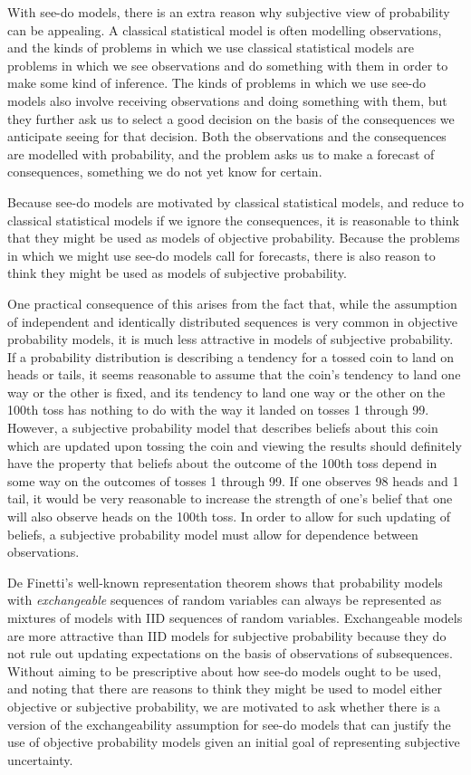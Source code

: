 With see-do models, there is an extra reason why subjective view of probability can be appealing. A classical statistical model is often modelling observations, and the kinds of problems in which we use classical statistical models are problems in which we see observations and do something with them in order to make some kind of inference. The kinds of problems in which we use see-do models also involve receiving observations and doing something with them, but they further ask us to select a good decision on the basis of the consequences we anticipate seeing for that decision. Both the observations and the consequences are modelled with probability, and the problem asks us to make a forecast of consequences, something we do not yet know for certain.

Because see-do models are motivated by classical statistical models, and reduce to classical statistical models if we ignore the consequences, it is reasonable to think that they might be used as models of objective probability. Because the problems in which we might use see-do models call for forecasts, there is also reason to think they might be used as models of subjective probability.

One practical consequence of this arises from the fact that, while the assumption of independent and identically distributed sequences is very common in objective probability models, it is much less attractive in models of subjective probability. If a probability distribution is describing a tendency for a tossed coin to land on heads or tails, it seems reasonable to assume that the coin's tendency to land one way or the other is fixed, and its tendency to land one way or the other on the 100th toss has nothing to do with the way it landed on tosses 1 through 99. However, a subjective probability model that describes beliefs about this coin which are updated upon tossing the coin and viewing the results should definitely have the property that beliefs about the outcome of the 100th toss depend in some way on the outcomes of tosses 1 through 99. If one observes 98 heads and 1 tail, it would be very reasonable to increase the strength of one's belief that one will also observe heads on the 100th toss. In order to allow for such updating of beliefs, a subjective probability model must allow for dependence between observations.

De Finetti's well-known representation theorem shows that probability models with \emph{exchangeable} sequences of random variables can always be represented as mixtures of models with IID sequences of random variables. Exchangeable models are more attractive than IID models for subjective probability because they do not rule out updating expectations on the basis of observations of subsequences. Without aiming to be prescriptive about how see-do models ought to be used, and noting that there are reasons to think they might be used to model either objective or subjective probability, we are motivated to ask whether there is a version of the exchangeability assumption for see-do models that can justify the use of objective probability models given an initial goal of representing subjective uncertainty.

